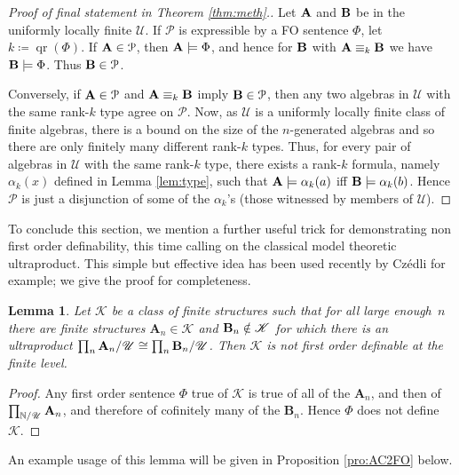 \documentclass[10pt,a4paper]{amsart}
\theoremstyle{plain}
\newtheorem{lem}[thm]{Lemma}
\theoremstyle{definition}
\newcommand{\qr}{\operatorname{qr}}
\begin{document}
\begin{proof}[Proof of final statement in Theorem \ref{thm:meth}.]
Let ${\bf A}$ and ${\bf B}$ be in the uniformly locally finite $\mathscr{U}$.
If $\mathcal{P}$ is expressible by a FO sentence $\Phi$, let $k\coloneqq \qr(\Phi)$. If ${\bf A}\in\mathcal{P}$, then ${\bf A}\models\Phi$, and hence for ${\bf B}$ with ${\bf A}\equiv_k{\bf B}$ we have ${\bf B}\models\Phi$. Thus ${\bf B}\in\mathcal{P}$.

Conversely, if ${\bf A}\in\mathcal{P}$ and ${\bf A}\equiv_k{\bf B}$ imply ${\bf B}\in\mathcal{P}$, then any two algebras in $\mathscr{U}$ with the same rank-$k$ type agree on $\mathcal{P}$. Now, as $\mathscr{U}$ is a uniformly locally finite class of finite algebras, there is a bound on the size of the $n$-generated algebras and so there are only finitely many different rank-$k$ types. Thus, for every pair of algebras in $\mathscr{U}$ with the same rank-$k$ type, there exists a rank-$k$ formula, namely $\alpha_k(x)$ defined in Lemma \ref{lem:type}, such that ${\bf A}\models \alpha_{k}(a)$ iff ${\bf B}\models \alpha_{k}(b)$. Hence $\mathcal{P}$ is just a disjunction of some of the $\alpha_{k}$'s (those witnessed by members of $\mathscr{U}$).
\end{proof}

To conclude this section, we mention a further useful trick for demonstrating non first order definability, this time calling on the classical model theoretic ultraproduct.  This simple but effective idea has been used recently by Cz\'edli \cite[\S2]{cze} for example; we give the proof for completeness.
\begin{lem}\label{lem:czedli}
Let $\mathscr{K}$ be a class of finite structures such that for all large enough~$n$ there are finite structures $\mathbf{A}_n\in \mathscr{K}$ and ${\bf B}_n\notin\mathscr{K}$ for which there is an ultraproduct $\prod_{n}{\bf A}_n/\mathscr{U}\cong \prod_{n}{\bf B}_n/\mathscr{U}$.  Then $\mathscr{K}$ is not first order definable at the finite level.
\end{lem}
\begin{proof}
Any first order sentence $\Phi$ true of $\mathscr{K}$ is true of all of the $\mathbf{A}_n$, and then of $\prod_{\mathbb{N}/\mathscr{U}}{\bf A}_n$, and therefore of cofinitely many of the $\mathbf{B}_n$.  Hence $\Phi$ does not define~$\mathscr{K}$.
\end{proof}
An example usage of this lemma will be given in Proposition \ref{pro:AC2FO} below.
\end{document}
